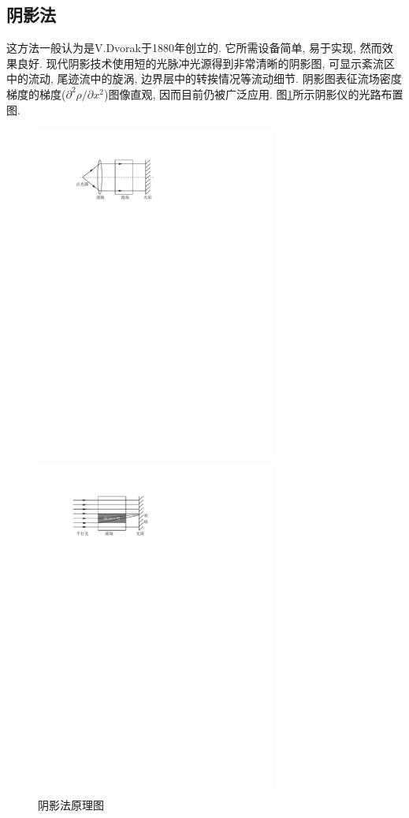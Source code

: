 \documentclass[12pt,a4paper,boxed,titlepage]{caspset}
\begin{document}
\subsection{阴影法}\label{basicshadow}
这方法一般认为是V.Dvorak于1880年创立的. 它所需设备简单, 易于实现, 然而效果良好. 现代阴影技术使用短的光脉冲光源得到非常清晰的阴影图, 可显示紊流区中的流动, 尾迹流中的旋涡, 边界层中的转挨情况等流动细节. 阴影图表征流场密度梯度的梯度($\partial^2\rho/\partial x^2$)图像直观, 因而目前仍被广泛应用. 图\ref{shadow01}所示阴影仪的光路布置图.
\begin{figure}[!htb]
\begin{minipage}[b]{.5\textwidth}
\centering
\includegraphics[width=0.7\textwidth]{shadow01.pdf}
\caption{\label{shadow01}阴影法原理图}
\end{minipage}%
\begin{minipage}[b]{.5\textwidth}
\centering
\includegraphics[width=0.7\textwidth]{shadow02.pdf}

\end{minipage}
\end{figure}
\end{document}
